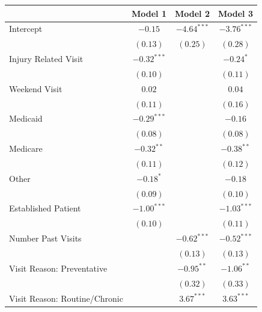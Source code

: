 \documentclass[12pt,twoside]{reedthesis}
\begin{document}
  \begin{table}
  \begin{center}
  \begin{small}
  \begin{tabular}{l c c c }
  \hline
   & Model 1 & Model 2 & Model 3 \\
  \hline
  Intercept                     & $-0.15$       & $-4.64^{***}$ & $-3.76^{***}$ \\
                                & $(0.13)$      & $(0.25)$      & $(0.28)$      \\
  Injury Related Visit          & $-0.32^{***}$ &               & $-0.24^{*}$   \\
                                & $(0.10)$      &               & $(0.11)$      \\
  Weekend Visit                 & $0.02$        &               & $0.04$        \\
                                & $(0.11)$      &               & $(0.16)$      \\
  Medicaid                      & $-0.29^{***}$ &               & $-0.16$       \\
                                & $(0.08)$      &               & $(0.08)$      \\
  Medicare                      & $-0.32^{**}$  &               & $-0.38^{**}$  \\
                                & $(0.11)$      &               & $(0.12)$      \\
  Other                         & $-0.18^{*}$   &               & $-0.18$       \\
                                & $(0.09)$      &               & $(0.10)$      \\
  Established Patient           & $-1.00^{***}$ &               & $-1.03^{***}$ \\
                                & $(0.10)$      &               & $(0.11)$      \\
  Number Past Visits            &               & $-0.62^{***}$ & $-0.52^{***}$ \\
                                &               & $(0.13)$      & $(0.13)$      \\
  Visit Reason: Preventative    &               & $-0.95^{**}$  & $-1.06^{**}$  \\
                                &               & $(0.32)$      & $(0.33)$      \\
  Visit Reason: Routine/Chronic &               & $3.67^{***}$  & $3.63^{***}$  \\

\end{tabular}
\end{small}
\end{center}
\end{table}
\end{document}
